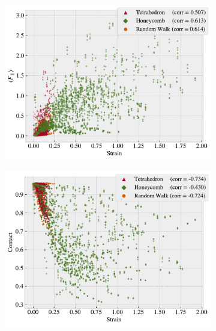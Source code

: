 \begin{figure}[H]
  \centering
  \begin{subfigure}[t]{0.49\textwidth}
      \centering
      \includegraphics[width=\textwidth]{figures/ML/corr_stretch_Ff.pdf}
      \caption{}
  \end{subfigure}
  \hfill
  \begin{subfigure}[t]{0.49\textwidth}
      \centering
      \includegraphics[width=\textwidth]{figures/ML/corr_stretch_contact.pdf}
      \caption{}
  \end{subfigure}
  \hfill
  \begin{subfigure}[t]{0.49\textwidth}
      \centering

\end{subfigure}
\end{figure}
